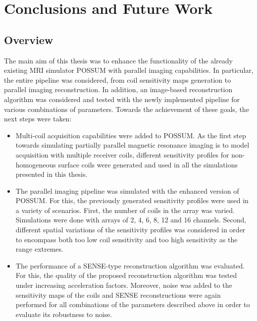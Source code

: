 \chapter{Conclusions and Future Work}
\label{chapterconclusions}

\section{Overview}
The main aim of this thesis was to enhance the functionality of the already existing MRI simulator POSSUM with parallel imaging capabilities. In particular, the entire pipeline was considered, from coil sensitivity maps generation to parallel imaging reconstruction. In addition, an image-based reconstruction algorithm was considered and tested with the newly implemented pipeline for various combinations of parameters. Towards the achievement of these goals, the next steps were taken:

\begin{itemize}
    \item Multi-coil acquisition capabilities were added to POSSUM. As the first step towards simulating partially parallel magnetic resonance imaging is to model acquisition with multiple receiver coils, different sensitivity profiles for non-homogeneous surface coils were generated and used in all the simulations presented in this thesis.
    
    \item The parallel imaging pipeline was simulated with the enhanced version of POSSUM. For this, the previously generated sensitivity profiles were used in a variety of scenarios. First, the number of coils in the array was varied. Simulations were done with arrays of 2, 4, 6, 8, 12 and 16 channels. Second, different spatial variations of the sensitivity profiles was considered in order to encompass both too low coil sensitivity and too high sensitivity as the range extremes. 
    
    \item The performance of a SENSE-type reconstruction algorithm was evaluated. For this, the quality of the proposed reconstruction algorithm was tested under increasing acceleration factors. Moreover, noise was added to the sensitivity maps of the coils and SENSE reconstructions were again performed for all combinations of the parameters described above in order to evaluate its robustness to noise.
\end{itemize}

